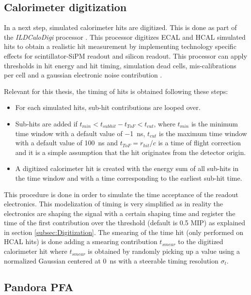 \subsection{Calorimeter digitization}
\label{subsec:ILDDigiCalo}

In a next step, simulated calorimeter hits are digitized. This is done as part of the \textit{ILDCaloDigi} processor \cite{Jeans2015}. This \marlin processor digitizes ECAL and HCAL simulated hits to obtain a realistic hit measurement by implementing technology specific effects for scintillator-SiPM readout and silicon readout. This processor can apply thresholds in hit energy and hit timing, simulation dead cells, mis-calibrations per cell and a gaussian electronic noise contribution \cite{Hartbrich:2016bbz}.

Relevant for this thesis, the timing of hits is obtained following these steps:
\begin{itemize}
  \item For each simulated hits, sub-hit contributions are looped over.
  \item Sub-hits are added if  $t_{min} < t_{subhit} - t_{ToF} < t_{cut}$, where $t_{min}$ is the minimum time window with a default value of \SI{-1}{\ns}, $t_{cut}$ is the maximum time window with a default value of \SI{100}{\ns} and $t_{ToF} = r_{hit} / c$ is a time of flight correction and it is a simple assumption that the hit originates from the detector origin.
  \item A digitized calorimeter hit is created with the energy sum of all sub-hits in the time window and with a time corresponding to the earliest sub-hit time.
\end{itemize}
This procedure is done in order to simulate the time acceptance of the readout electronics. This modelization of timing is very simplified as in reality the electronics are shaping the signal with a certain shaping time and register the time of the first contribution over the threshold (default is 0.5 MIP) as explained in section \ref{subsec:Digitization}. The smearing of the time hit (only performed on HCAL hits) is done adding a smearing contribution $t_{smear}$ to the digitized calorimeter hit where $t_{smear}$ is obtained by randomly picking up a value using a normalized Gaussian centered at \SI{0}{\nano\second} with a steerable timing resolution $\sigma_{t}$.

\subsection{Pandora PFA}


